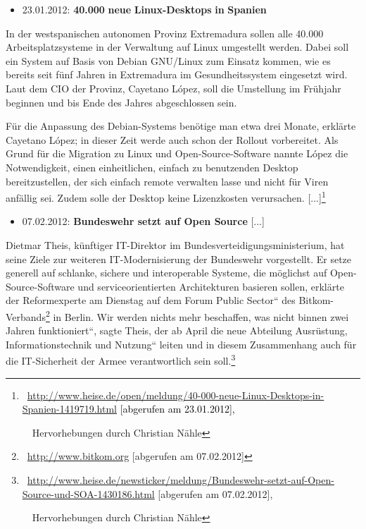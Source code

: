 \documentclass[a4paper]{article}
\newcommand\textstyleInternetlink[1]{\foreignlanguage{english}{\textcolor[rgb]{0.0,0.0,0.5019608}{#1}}}
\newcommand\liststyleWWviiiNumiii{%
\renewcommand\theenumi{\arabic{enumi}}
\renewcommand\theenumii{\arabic{enumii}}
\renewcommand\theenumiii{\arabic{enumiii}}
\renewcommand\labelitemi{{}-}
\renewcommand\labelenumi{\theenumi.}
\renewcommand\labelenumii{\theenumii.}
\renewcommand\labelenumiii{\theenumiii.}
}
\begin{document}
\bigskip

\liststyleWWviiiNumiii
\begin{itemize}
\item {
{\guillemotright}23.01.2012: \textbf{40.000}\textbf{
}\textbf{neue}\textbf{ }\textbf{Linux-Desktops}\textbf{
}\textbf{in}\textbf{ }\textbf{Spanien}}
\end{itemize}
{
In der westspanischen autonomen Provinz Extremadura sollen alle 40.000
Arbeitsplatzsysteme in der Verwaltung auf Linux umgestellt werden.
Dabei soll ein System auf Basis von Debian GNU/Linux zum Einsatz
kommen, wie es bereits seit f\"unf Jahren in Extremadura im
Gesundheitssystem eingesetzt wird. Laut dem CIO der Provinz, Cayetano
L\'opez, soll die Umstellung im Fr\"uhjahr beginnen und bis Ende des
Jahres abgeschlossen sein.}

{
F\"ur die Anpassung des Debian-Systems ben\"otige man etwa drei Monate,
erkl\"arte Cayetano L\'opez; in dieser Zeit werde auch schon der
Rollout vorbereitet. Als Grund f\"ur die Migration zu Linux und
Open-Source-Software nannte L\'opez die Notwendigkeit, einen
einheitlichen, einfach zu benutzenden Desktop bereitzustellen, der sich
einfach remote verwalten lasse und nicht f\"ur Viren anf\"allig sei.
Zudem solle der Desktop keine Lizenzkosten verursachen.
[...]{\guillemotleft}\footnote{\ \url{http://www.heise.de/open/meldung/40-000-neue-Linux-Desktops-in-Spanien-1419719.html}\textcolor{black}{
[abgerufen am 23.01.2012],}\par \ \ Hervorhebungen durch Christian
N\"ahle}}


\bigskip

\liststyleWWviiiNumiii
\begin{itemize}
\item {
{\guillemotright}07.02.2012: \textbf{Bundeswehr setzt auf Open Source
}[...]}
\end{itemize}
{
Dietmar Theis, k\"unftiger IT-Direktor im
Bundesverteidigungsministerium, hat seine Ziele zur weiteren
IT-Modernisierung der Bundeswehr vorgestellt. Er setze generell auf
schlanke, sichere und interoperable Systeme, die m\"oglichst auf
Open-Source-Software und serviceorientierten Architekturen basieren
sollen, erkl\"arte der Reformexperte am Dienstag auf dem
{\quotedblbase}Forum Public Sector{\textquotedblleft} des
Bitkom-Verbands\footnote{\ \href{http://www.bitkom.org/}{\textstyleInternetlink{http://www.bitkom.org}}
[abgerufen am 07.02.2012]} in Berlin. {\quotedblbase}Wir werden nichts
mehr beschaffen, was nicht binnen zwei Jahren
funktioniert{\textquotedblleft}, sagte Theis, der ab April die neue
Abteilung {\quotedblbase}Ausr\"ustung, Informationstechnik und
Nutzung{\textquotedblleft} leiten und in diesem Zusammenhang auch f\"ur
die IT-Sicherheit der Armee verantwortlich sein
soll.{\guillemotleft}\footnote{\ \url{http://www.heise.de/newsticker/meldung/Bundeswehr-setzt-auf-Open-Source-und-SOA-1430186.html}
[abgerufen am 07.02.2012],\par \ \ Hervorhebungen durch Christian
N\"ahle}}
\end{document}

